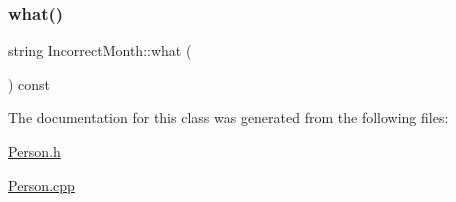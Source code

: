 \subsubsection{\texorpdfstring{what()}{what()}}
{\footnotesize\ttfamily string Incorrect\+Month\+::what (\begin{DoxyParamCaption}{ }\end{DoxyParamCaption}) const}



The documentation for this class was generated from the following files\+:\begin{DoxyCompactItemize}
\item 
\mbox{\hyperlink{_person_8h}{Person.\+h}}\item 
\mbox{\hyperlink{_person_8cpp}{Person.\+cpp}}\end{DoxyCompactItemize}
